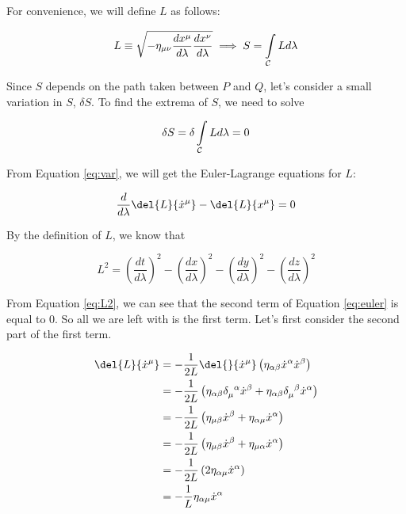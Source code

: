 \documentclass[11pt]{article}
\begin{document}
For convenience, we will define $L$ as follows:

\begin{equation}\label{eq:defineL}
  L \equiv \sqrt{-\eta_{\mu\nu}\frac{dx^\mu}{d\lambda}\frac{dx^\nu}{d\lambda}} \implies S = \int\limits_{\mathcal{C}} L \\ d\lambda
\end{equation}

Since $S$ depends on the path taken between $P$ and $Q$, let's consider a small variation in $S$, $\delta S$. To find the extrema of $S$, we need to solve

\begin{equation}\label{eq:var}
  \delta S = \delta \int\limits_{\mathcal{C}} L \\ d\lambda = 0
\end{equation}

From Equation \ref{eq:var}, we will get the Euler-Lagrange equations for $L$: 

\begin{equation}\label{eq:euler}
  \frac{d}{d\lambda}\del{L}{\dot{x}^\mu} - \del{L}{x^\mu} = 0
\end{equation}

By the definition of $L$, we know that

\begin{equation}\label{eq:L2}
  L^2 = \left(\frac{dt}{d\lambda}\right)^2 - \left(\frac{dx}{d\lambda}\right)^2 - \left(\frac{dy}{d\lambda}\right)^2 - \left(\frac{dz}{d\lambda}\right)^2
\end{equation}

From Equation \ref{eq:L2}, we can see that the second term of Equation \ref{eq:euler} is equal to 0. So all we are left with is the first term. Let's first consider the second part of the first term. 

\begin{equation}\label{eq:simplify}
  \begin{split}
    \del{L}{\dot{x}^\mu} & = - \frac{1}{2L} \del{}{\dot{x}^\mu}\left(\eta_{\alpha\beta} \dot{x}^\alpha \dot{x}^\beta \right) \\
    & = -\frac{1}{2L} \left(\eta_{\alpha\beta} \tensor{\delta}{_\mu^\alpha} \dot{x}^\beta + \eta_{\alpha\beta} \tensor{\delta}{_\mu^\beta} \dot{x}^\alpha \right) \\
    & = -\frac{1}{2L} \left(\eta_{\mu\beta} \dot{x}^\beta + \eta_{\alpha\mu} \dot{x}^\alpha \right) \\
    & = -\frac{1}{2L} \left(\eta_{\mu\beta} \dot{x}^\beta + \eta_{\mu\alpha} \dot{x}^\alpha \right) \\
    & = -\frac{1}{2L} \left(2 \eta_{\alpha\mu}\dot{x}^\alpha \right) \\
    & = -\frac{1}{L} \eta_{\alpha\mu}\dot{x}^\alpha
  \end{split}
\end{equation}
\end{document}
